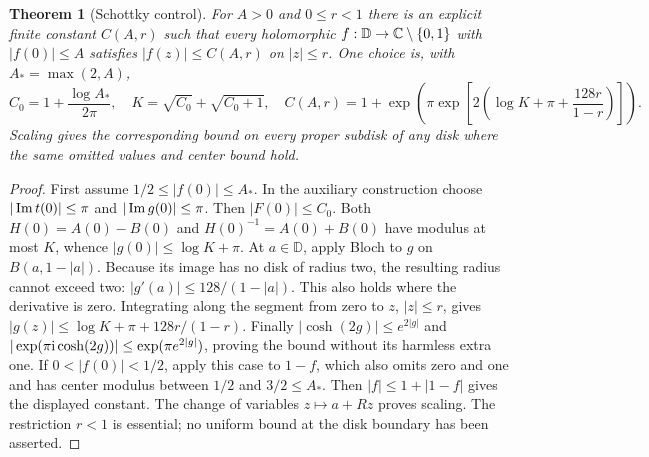 \documentclass[11pt,a4paper,openany]{book}
\newtheorem{theorem}{Theorem}[chapter]
\theoremstyle{definition}
\theoremstyle{remark}\newtheorem{remark}[theorem]{Remark}
\newcommand{\D}{\mathbb D}\newcommand{\Chat}{\widehat{\mathbb C}}
\newcommand{\family}[1]{}
\begin{document}
\begin{theorem}[Schottky control]\label{d12:23-03}\family{D12.23.03}
For $A>0$ and $0\le r<1$ there is an explicit finite constant
$C(A,r)$ such that every holomorphic $f:\D\to\C\setminus\{0,1\}$
with $|f(0)|\le A$ satisfies $|f(z)|\le C(A,r)$ on $|z|\le r$.
One choice is, with $A_*=\max(2,A)$,
\[
 C_0=1+\frac{\log A_*}{2\pi},\quad K=\sqrt{C_0}+\sqrt{C_0+1},
 \quad C(A,r)=1+\exp\left(\pi\exp\left[
             2\left(\log K+\pi+\frac{128r}{1-r}\right)\right]\right).
\]
Scaling gives the corresponding bound on every proper subdisk of any
disk where the same omitted values and center bound hold.
\end{theorem}
\begin{proof}
First assume $1/2\le|f(0)|\le A_*$. In the auxiliary construction
choose $|\operatorname{Im} t(0)|\le\pi$ and $|\operatorname{Im} g(0)|\le\pi$.
Then $|F(0)|\le C_0$. Both
$H(0)=A(0)-B(0)$ and $H(0)^{-1}=A(0)+B(0)$ have modulus at most
$K$, whence $|g(0)|\le\log K+\pi$.
At $a\in\D$, apply Bloch to $g$ on $B(a,1-|a|)$. Because its image
has no disk of radius two, the resulting radius cannot exceed two:
$|g'(a)|\le128/(1-|a|)$. This also holds where the derivative is zero.
Integrating along the segment from zero to $z$, $|z|\le r$, gives
$|g(z)|\le\log K+\pi+128r/(1-r)$.
Finally $|\cosh(2g)|\le e^{2|g|}$ and
$|\exp(\pi\mathrm i\cosh(2g))|\le\exp(\pi e^{2|g|})$, proving the
bound without its harmless extra one. If $0<|f(0)|<1/2$, apply this
case to $1-f$, which also omits zero and one and has center modulus
between $1/2$ and $3/2\le A_*$. Then
$|f|\le1+|1-f|$ gives the displayed constant. The change of variables
$z\mapsto a+Rz$ proves scaling. The restriction $r<1$ is essential;
no uniform bound at the disk boundary has been asserted.
\end{proof}
\end{document}
